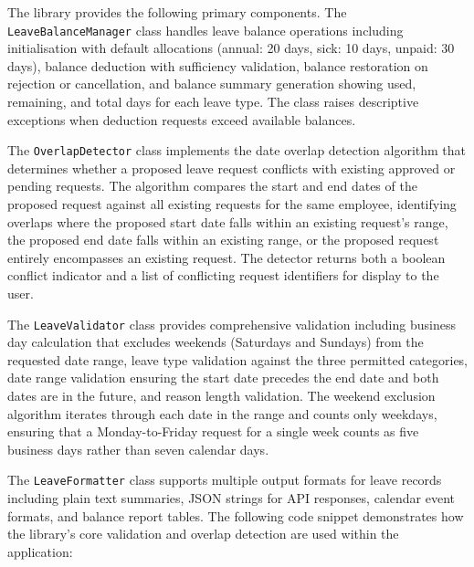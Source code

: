 \documentclass[conference]{IEEEtran}
\begin{document}
The library provides the following primary components. The \texttt{LeaveBalanceManager} class handles leave balance operations including initialisation with default allocations (annual: 20 days, sick: 10 days, unpaid: 30 days), balance deduction with sufficiency validation, balance restoration on rejection or cancellation, and balance summary generation showing used, remaining, and total days for each leave type. The class raises descriptive exceptions when deduction requests exceed available balances.

The \texttt{OverlapDetector} class implements the date overlap detection algorithm that determines whether a proposed leave request conflicts with existing approved or pending requests. The algorithm compares the start and end dates of the proposed request against all existing requests for the same employee, identifying overlaps where the proposed start date falls within an existing request's range, the proposed end date falls within an existing range, or the proposed request entirely encompasses an existing request. The detector returns both a boolean conflict indicator and a list of conflicting request identifiers for display to the user.

The \texttt{LeaveValidator} class provides comprehensive validation including business day calculation that excludes weekends (Saturdays and Sundays) from the requested date range, leave type validation against the three permitted categories, date range validation ensuring the start date precedes the end date and both dates are in the future, and reason length validation. The weekend exclusion algorithm iterates through each date in the range and counts only weekdays, ensuring that a Monday-to-Friday request for a single week counts as five business days rather than seven calendar days.

The \texttt{LeaveFormatter} class supports multiple output formats for leave records including plain text summaries, JSON strings for API responses, calendar event formats, and balance report tables. The following code snippet demonstrates how the library's core validation and overlap detection are used within the application:
\end{document}
